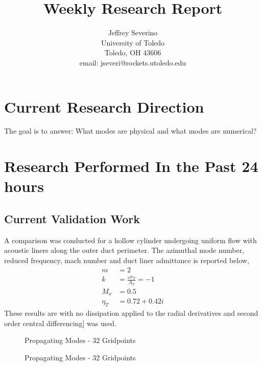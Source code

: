 \documentclass[a4paper]{article}
\begin{document}
\begin{titlepage}

    \title{
    Weekly Research Report}


    \author{ Jeffrey Severino \\
        University of Toledo \\
        Toledo, OH  43606 \\
    email: jseveri@rockets.utoledo.edu}


    \maketitle

\end{titlepage}
\section{Current Research Direction}
The goal is to answer: What modes are physical and what modes are numerical?
\section{Research Performed In the Past 24 hours}

\subsection{Current Validation Work}

A comparison was conducted for a hollow cylinder undergoing uniform flow with
acoustic liners along the outer duct perimeter. The azimuthal mode number, reduced 
frequency, mach number and duct liner admittance is reported below,
\begin{align*}
    m &= 2 \\
    k &= \frac{\omega r_T}{A_T} = -1 \\
    M_x &= 0.5 \\
    \eta_T &= 0.72 + 0.42i
\end{align*} 
These results are with no dissipation applied to the radial derivatives and 
second order central differencing] was used.
\begin{figure}
    \centering
    
    \caption{Propagating Modes - 32 Gridpoints}
\end{figure}

\begin{figure}
    \centering
    
    \caption{Propagating Modes - 32 Gridpoints}
\end{figure}
\end{document}
